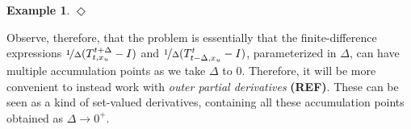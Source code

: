 \documentclass[10pt,a4paper]{paper}
\theoremstyle{definition}
\newtheorem{exmp}{Example}%
\newcommand{\nats}{\mathbb{N}}
\newcommand{\reals}{\mathbb{R}}
\newcommand{\realspos}{\reals_{>0}}
\newcommand{\realsnonneg}{\reals_{\geq 0}}
\newcommand{\states}{\mathcal{X}}
\newcommand{\processes}{\mathbb{P}}
\newcommand{\wprocesses}{\processes^{\mathrm{W}}}
\newcommand{\wmprocesses}{\processes^{\mathrm{WM}}}
\newcommand{\coloneqq}{:\!=}
\newcommand{\exampleend}{\hfill$\Diamond$}
\begin{document}
\begin{exmp}
%
%
\exampleend
\end{exmp}

Observe, therefore, that the problem is essentially that the finite-difference expressions $\nicefrac{1}{\Delta}(T_{t,x_u}^{t+\Delta} - I)$ and $\nicefrac{1}{\Delta}(T_{t-\Delta,x_u}^{t} - I)$, parameterized in $\Delta$, can have multiple accumulation points as we take $\Delta$ to $0$. Therefore, it will be more convenient to instead work with \emph{outer partial derivatives} {\bf (REF)}. These can be seen as a kind of set-valued derivatives, containing all these accumulation points obtained as $\Delta\to0^+$.
\end{document}
